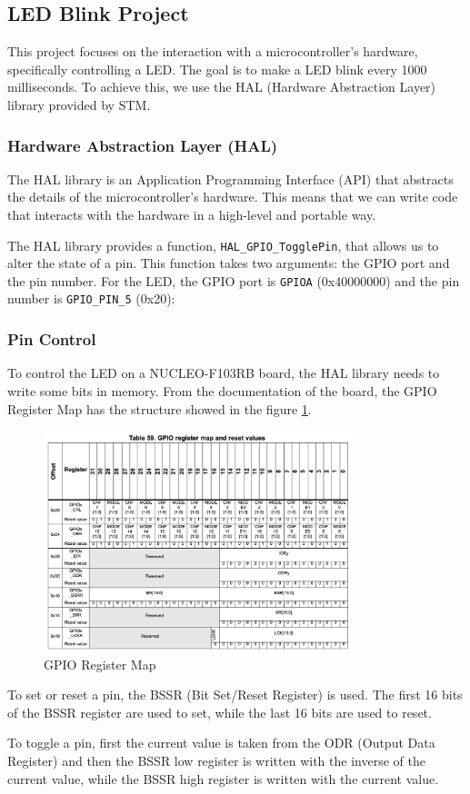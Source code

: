 \subsection{LED Blink Project}

This project focuses on the interaction with a microcontroller's hardware, specifically controlling a LED. The goal is to make a LED blink every 1000 milliseconds. To achieve this, we use the HAL (Hardware Abstraction Layer) library provided by STM.

\subsubsection{Hardware Abstraction Layer (HAL)}

The HAL library is an Application Programming Interface (API) that abstracts the details of the microcontroller's hardware. This means that we can write code that interacts with the hardware in a high-level and portable way.

The HAL library provides a function, \texttt{HAL\_GPIO\_TogglePin}, that allows us to alter the state of a pin. This function takes two arguments: the GPIO port and the pin number. For the LED, the GPIO port is \texttt{GPIOA} (0x40000000) and the pin number is \texttt{GPIO\_PIN\_5} (0x20):

\subsubsection{Pin Control}

To control the LED on a NUCLEO-F103RB board, the HAL library needs to write some bits in memory. From the documentation of the board, the GPIO Register Map has the structure showed in the figure \ref{fig:gpio_register_map}.

\begin{figure}[ht]
    \centering
    \includegraphics[width=0.8\textwidth]{images/projects/gpio_register_map.png}
    \caption{GPIO Register Map}
    \label{fig:gpio_register_map}
\end{figure}

To set or reset a pin, the BSSR (Bit Set/Reset Register) is used. The first 16 bits of the BSSR register are used to set, while the last 16 bits are used to reset.

To toggle a pin, first the current value is taken from the ODR (Output Data Register) and then the BSSR low register is written with the inverse of the current value, while the BSSR high register is written with the current value.